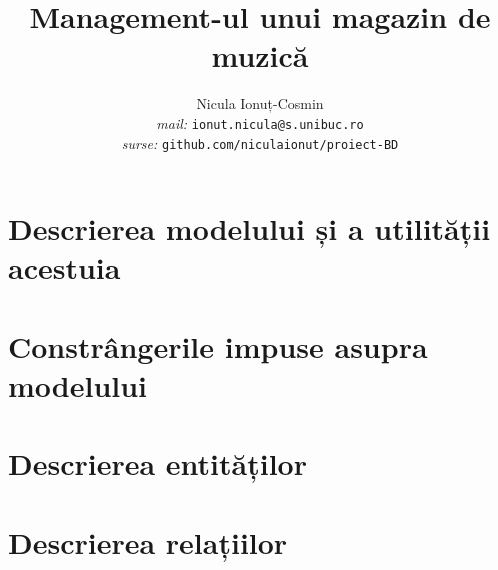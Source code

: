 \documentclass[a4paper, oneside, 12pt]{article}
\title{Management-ul unui magazin de muzică}
\author{Nicula Ionuț-Cosmin \\ \emph{mail: }\texttt{ionut.nicula@s.unibuc.ro}
\\ \emph{surse: }\texttt{github.com/niculaionut/proiect-BD}}
\begin{document}
\maketitle

\section{Descrierea modelului și a utilității acestuia}

\section{Constrângerile impuse asupra modelului}

\section{Descrierea entităților}

\section{Descrierea relațiilor}
\end{document}

